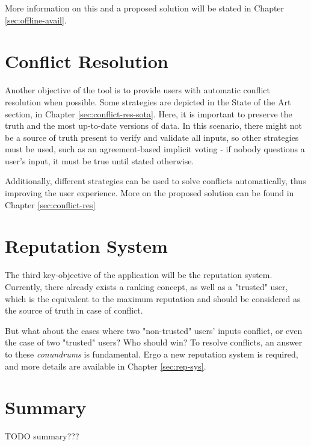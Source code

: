More information on this and a proposed solution will be stated in Chapter \ref{sec:offline-avail}.

\section{Conflict Resolution} \label{sec:conflict-res-intro}

Another objective of the tool is to provide users with automatic conflict resolution when possible. Some strategies are depicted in the State of the Art section, in Chapter \ref{sec:conflict-res-sota}. Here, it is important to preserve the truth and the most up-to-date versions of data. In this scenario, there might not be a source of truth present to verify and validate all inputs, so other strategies must be used, such as an agreement-based implicit voting - if nobody questions a user's input, it must be true until stated otherwise.

Additionally, different strategies can be used to solve conflicts automatically, thus improving the user experience. More on the proposed solution can be found in Chapter \ref{sec:conflict-res} 

\section{Reputation System} \label{sec:rep-sys-intro}

The third key-objective of the application will be the reputation system. Currently, there already exists a ranking concept, as well as a "trusted" user, which is the equivalent to the maximum reputation and should be considered as the source of truth in case of conflict.

But what about the cases where two "non-trusted" users' inputs conflict, or even the case of two "trusted" users? Who should win? To resolve conflicts, an answer to these \textit{conundrums} is fundamental. Ergo a new reputation system is required, and more details are available in Chapter \ref{sec:rep-sys}.

\section{Summary} \label{sec:summary-intro}

TODO summary???

